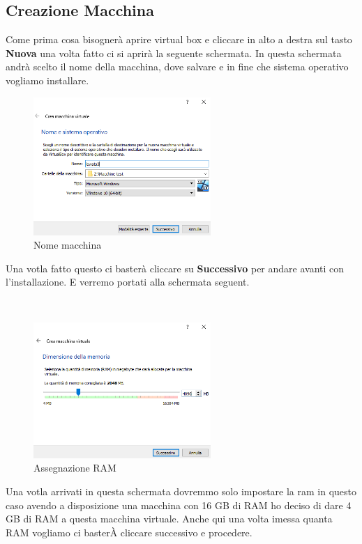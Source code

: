 \documentclass[../main.tex]{subfiles}
\begin{document}
\subsection{Creazione Macchina}
Come prima cosa bisognerà aprire virtual box e cliccare in alto a destra sul tasto \textbf{Nuova} una volta fatto ci si aprirà la seguente schermata. In questa schermata andrà scelto il nome della macchina, dove salvare e in fine che sistema operativo vogliamo installare. 


\begin{figure}[h]
    \centering
    \includegraphics[width=0.6\textwidth]{Images/set-up1.PNG}
    \caption{Nome macchina}
\end{figure}
  Una votla fatto questo ci basterà cliccare su \textbf{Successivo} per andare avanti con l'installazione. E verremo portati alla schermata seguent.
  
\

\begin{figure}[h]
    \centering
    \includegraphics[width=0.6\textwidth]{Images/set-up2.PNG}
    \caption{Assegnazione RAM}
\end{figure}

\pagebreak{}
\thispagestyle{header-pages}

Una votla arrivati in questa schermata dovremmo solo impostare la ram in questo caso avendo a disposizione una macchina con 16 GB di RAM ho deciso di dare 4 GB di RAM a questa macchina virtuale. Anche qui una volta imessa quanta RAM vogliamo ci basterÀ cliccare successivo e procedere.
\end{document}
